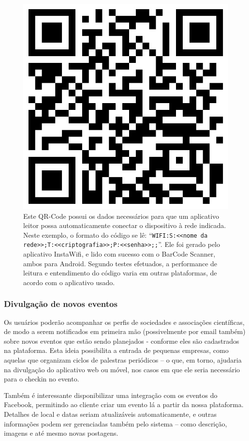 \documentclass[12pt,a4paper,twoside,hyphens,english,brazil]{abntex2}
\begin{document}
\begin{figure}
	\centering
	\includegraphics[width=0.27\linewidth]{imagens/qr-wifi}
	\protect\caption[QR-Code com dados da rede Wi-Fi]{Este QR-Code possui os dados necessários para que um aplicativo leitor possa automaticamente conectar o dispositivo à rede indicada. Neste exemplo, o formato do código se lê: ``\texttt{WIFI:S:<<nome da rede>>;T:<<criptografia>>;P:<<senha>>;;}''. Ele foi gerado pelo aplicativo InstaWifi\cite{instawifi}, e lido com sucesso com o BarCode Scanner\cite{barcode}, ambos para Android. Segundo testes efetuados, a performance de leitura e entendimento do código varia em outras plataformas, de acordo com o aplicativo usado.}
	\label{fig:qr-wifi}
\end{figure}

\subsubsection*{Divulgação de novos eventos}
Os usuários poderão acompanhar os perfis de sociedades e associações científicas, de modo a serem notificados em primeira mão (possivelmente por email também) sobre novos eventos que estão sendo planejados - conforme eles são cadastrados na plataforma.
Esta ideia possibilita a entrada de pequenas empresas, como aquelas que organizam ciclos de palestras periódicos -- o que, em torno, ajudaria na divulgação do aplicativo web ou móvel, nos casos em que ele seria necessário para o checkin no evento.

Também é interessante disponibilizar uma integração com os eventos do Facebook, permitindo ao cliente criar um evento lá a partir da nossa plataforma. Detalhes de local e datas seriam atualizáveis automaticamente, e outras informações podem ser gerenciadas também pelo sistema -- como descrição, imagens e até mesmo novas postagens.
\end{document}
